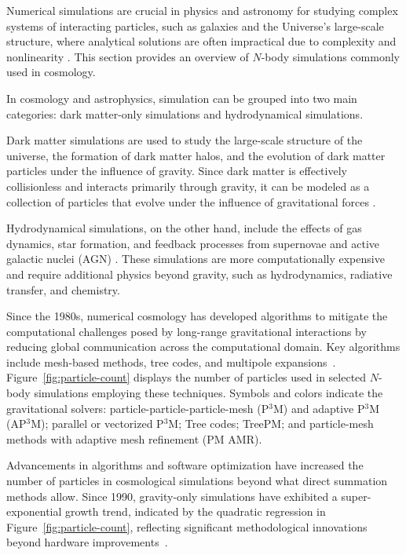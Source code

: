 Numerical simulations are crucial in physics and astronomy for studying complex systems of interacting particles, such as galaxies and the Universe's large-scale structure, where analytical solutions are often impractical due to complexity and nonlinearity \citep{1981csup.book.....H, 1985ApJS...57..241E, 2005Natur.435..629S, 2005MNRAS.364.1105S}. This section provides an overview of $N$-body simulations commonly used in cosmology.

In cosmology and astrophysics, simulation can be grouped into two main categories: dark matter-only simulations and hydrodynamical simulations. 

Dark matter simulations are used to study the large-scale structure of the universe, the formation of dark matter halos, and the evolution of dark matter particles under the influence of gravity. Since dark matter is effectively collisionless and interacts primarily through gravity, it can be modeled as a collection of particles that evolve under the influence of gravitational forces \citep{1985ApJS...57..241E}. 

Hydrodynamical simulations, on the other hand, include the effects of gas dynamics, star formation, and feedback processes from supernovae and active galactic nuclei (AGN) \citep{1989ApJS...70..419H, 2005Natur.435..629S, 2005MNRAS.364.1105S}. These simulations are more computationally expensive and require additional physics beyond gravity, such as hydrodynamics, radiative transfer, and chemistry.

Since the 1980s, numerical cosmology has developed algorithms to mitigate the computational challenges posed by long-range gravitational interactions by reducing global communication across the computational domain. Key algorithms include mesh-based methods, tree codes, and multipole expansions~\citep{1981csup.book.....H}. Figure~\ref{fig:particle-count} displays the number of particles used in selected $N$-body simulations employing these techniques. Symbols and colors indicate the gravitational solvers: particle-particle-particle-mesh (P$^3$M) and adaptive P$^3$M (AP$^3$M); parallel or vectorized P$^3$M; Tree codes; TreePM; and particle-mesh methods with adaptive mesh refinement (PM AMR).

Advancements in algorithms and software optimization have increased the number of particles in cosmological simulations beyond what direct summation methods allow. Since 1990, gravity-only simulations have exhibited a super-exponential growth trend, indicated by the quadratic regression in Figure~\ref{fig:particle-count}, reflecting significant methodological innovations beyond hardware improvements~\citep{leclercq2020}.

